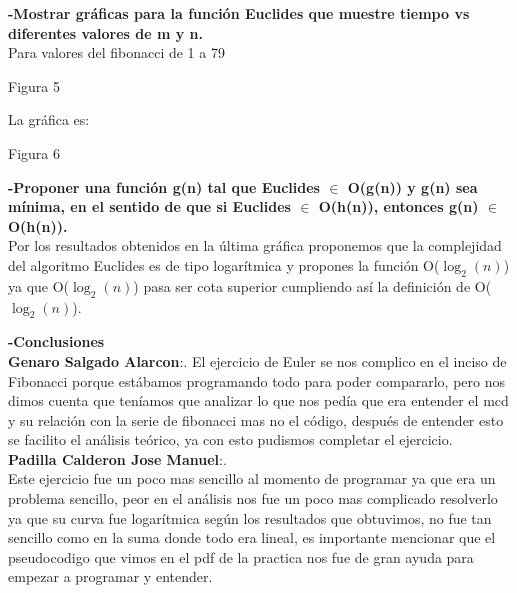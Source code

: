 \documentclass[spanish]{article}
\begin{document}
\bigskip

	{\large{\bf -Mostrar gráficas para la función Euclides que muestre tiempo vs diferentes valores de m y n.}}\\
	Para valores del fibonacci de 1 a 79
	\begin{center}

		Figura 5\\
	\end{center}

	La gráfica es:\\
	\begin{center}
		Figura 6\\
	\end{center}

	{\large{\bf -Proponer una función g(n) tal que Euclides $\in$ O(g(n)) y g(n) sea mínima, en el sentido de que si Euclides $\in$  O(h(n)), entonces g(n) $\in$  O(h(n)).}}\\
	Por los resultados obtenidos en la última gráfica proponemos que la complejidad del algoritmo Euclides es de tipo logarítmica y propones la función O($\log_{2}(n)$) ya que O($\log_{2}(n)$) pasa ser cota superior cumpliendo así la definición de O($\log_{2}(n)$).
	\bigskip
	
	{\large {\bf -Conclusiones}}\\
	{\bf Genaro Salgado Alarcon}:.
	El ejercicio de Euler se nos complico en el inciso de Fibonacci porque estábamos programando todo para poder compararlo, pero nos dimos cuenta que teníamos que analizar lo que nos pedía que era entender el mcd y su relación con la serie de fibonacci mas no el código, después de entender esto se facilito el análisis teórico, ya con esto pudismos completar el ejercicio. \\
{\bf Padilla Calderon Jose Manuel}:.\\Este ejercicio fue un poco mas sencillo al momento de programar ya que era un problema sencillo, peor en el análisis nos fue un poco mas complicado resolverlo ya que su curva fue logarítmica según los resultados que obtuvimos, no fue tan sencillo como en la suma donde todo era lineal, es importante mencionar que el pseudocodigo que vimos en el pdf de la practica nos fue de gran ayuda para empezar a programar y entender.
\\

	\newpage
\end{document}
